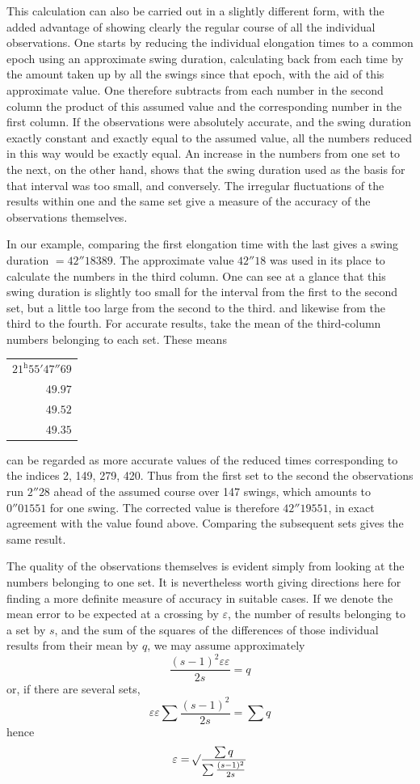This calculation can also be carried out in a slightly different form, with the added advantage of showing clearly the regular course of all the individual observations. One starts by reducing the individual elongation times to a common epoch using an approximate swing duration, calculating back from each time by the amount taken up by all the swings since that epoch, with the aid of this approximate value. One therefore subtracts from each number in the second
column the product of this assumed value and the corresponding number in the first column. If the observations were absolutely accurate, and the swing duration exactly constant and exactly equal to the assumed value, all the numbers reduced in this way would be exactly equal. An increase in the numbers from one set to the next, on the other hand, shows that the swing duration used as the basis for that interval was too small, and conversely. The irregular fluctuations of the results within one and the same set give a measure of the accuracy of the observations themselves.

In our example, comparing the first elongation time with the last gives a swing duration $=42''18389$. The approximate value $42''18$ was used in its place to calculate the numbers in the third column. One can see at a glance that this swing duration is slightly too small for the interval from the first to the second set, but a little too large from the second to the third. and likewise from the third to the fourth. For accurate results, take the mean of the third-column numbers belonging to each set. These means
\begin{center}
\begin{tabular}{r}
$21^{\mathrm{h}}55'47''69$\\
$49.97$\\
$49.52$\\
$49.35$
\end{tabular}
\end{center}
can be regarded as more accurate values of the reduced times corresponding to the indices 2, 149, 279, 420. Thus from the first set to the second the observations run $2''28$ ahead of the assumed course over 147 swings, which amounts to $0''01551$ for one swing. The corrected value is therefore $42''19551$, in exact agreement with the value found above. Comparing the subsequent sets gives the same result.

The quality of the observations themselves is evident simply from looking at the numbers belonging to one set. It is nevertheless worth giving directions here for finding a more definite measure of accuracy in suitable cases. If we denote the mean error to be expected at a crossing by $\varepsilon$, the number of results belonging to a set by $s$, and the sum of the squares of the differences of those individual results
from their mean by $q$, we may assume approximately
\[
\frac{(s-1)^2\varepsilon\varepsilon}{2s}=q
\]
or, if there are several sets,
\[
\varepsilon\varepsilon\sum\frac{(s-1)^2}{2s}=\sum q
\]
hence
\[
\varepsilon=\mathord{{}^{}\!\surd}\frac{\sum q}{\sum\frac{(s-1)^2}{2s}}
\]

